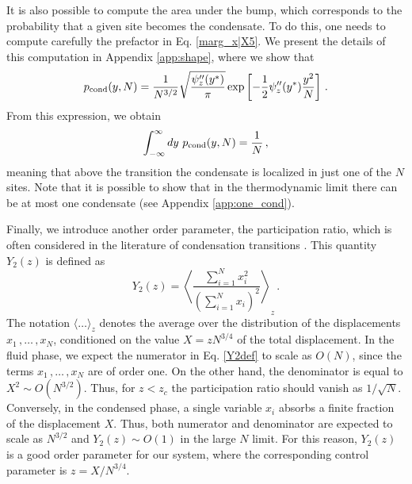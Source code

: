 \documentclass[aps,pre,twocolumn,superscriptaddress,showpacs]{revtex4-1}
\newcommand{\be}{\begin{equation}}
\newcommand{\ee}{\end{equation}}
\begin{document}
It is also possible to compute the area under the bump, which corresponds to the probability that a given site becomes the condensate. To do this, one needs to compute carefully the prefactor in Eq. \eqref{marg_x|X5}. We present the details of this computation in Appendix \ref{app:shape}, where we show that
\be
p_{\rm cond}(y,N)=\frac{1}{N^{3/2}}\sqrt{\frac{\psi''_z(y^*)}{\pi}} \exp\left[-\frac12 \psi''_z(y^*) \frac{y^2}{N}\right]\,.
\label{pcond_full}
\ee
From this expression, we obtain
\begin{equation}
\int_{-\infty}^{\infty}dy~p_{\rm cond}(y,N)=\frac{1}{N}\,,
\label{marg_normalization}
\end{equation}
meaning that above the transition the condensate is localized in just one of the $N$ sites. Note that it is possible to show that in the thermodynamic limit there can be at most one condensate (see Appendix \ref{app:one_cond}).



Finally, we introduce another order parameter, the participation ratio, which is often considered in the literature of condensation transitions \cite{GIL21,GIP21}. This quantity $Y_2(z)$ is defined as
\begin{equation}
Y_2(z)={\left\langle\frac{\sum_{i=1}^Nx_i^2}{\left(\sum_{i=1}^Nx_i\right)^2}\right\rangle}_z\,.
\label{Y2def}
\end{equation}
The notation $\langle\ldots\rangle_z$ denotes the average over the distribution of the displacements $x_1\,,\ldots\,,x_N$, conditioned on the value $X=z N^{3/4}$ of the total displacement. In the fluid phase, we expect the numerator in Eq. \eqref{Y2def} to scale as $O(N)$, since the terms $x_1\,,\ldots\,,x_N$ are of order one. On the other hand, the denominator is equal to $X^2\sim O(N^{3/2})$. Thus, for $z<z_c$ the participation ratio should vanish as $1/\sqrt{N}$. Conversely, in the condensed phase, a single variable $x_i$ absorbs a finite fraction of the displacement $X$. Thus, both numerator and denominator are expected to scale as $N^{3/2}$ and $Y_2(z)\sim O(1)$ in the large $N$ limit. For this reason, $Y_2(z)$ is a good order parameter for our system, where the corresponding control parameter is $z=X/N^{3/4}$. 
\end{document}
